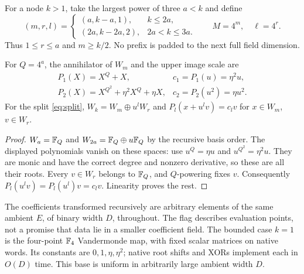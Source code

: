 For a node $k>1$, take the largest power of three $a<k$ and define
\begin{equation}\label{eq:split}
 (m,r,l)=
 \begin{cases}
 (a,k-a,1),& k\leq2a,\\
 (2a,k-2a,2),& 2a<k\leq3a.
 \end{cases}
 \qquad M=4^m,\quad \ell=4^r.
\end{equation}
Thus $1\leq r\leq a$ and $m\geq k/2$. No prefix is padded to the
next full field dimension.

\begin{lemma}\label{lem:annihilator}
For $Q=4^a$, the annihilator of $W_m$ and the upper image scale are
\[
 \begin{array}{ll}
 P_1(X)=X^Q+X,&c_1=P_1(u)=\eta^2u,\\[2pt]
 P_2(X)=X^{Q^2}+\eta^2X^Q+\eta X,
       &c_2=P_2(u^2)=\eta u^2.
 \end{array}
\]
For the split \eqref{eq:split},
$W_k=W_m\oplus u^lW_r$ and $P_l(x+u^lv)=c_lv$ for
$x\in W_m$, $v\in W_r$.
\end{lemma}
\begin{proof}
$W_a=\mathbb F_Q$ and $W_{2a}=\mathbb F_Q\oplus u\mathbb F_Q$ by the recursive
basis order. The displayed polynomials vanish on these spaces: use
$u^Q=\eta u$ and $u^{Q^2}=\eta^2u$. They are monic and have the
correct degree and nonzero derivative, so these are all their roots.
Every $v\in W_r$ belongs to $\mathbb F_Q$, and $Q$-powering fixes $v$.
Consequently $P_l(u^lv)=P_l(u^l)v=c_lv$. Linearity proves the rest.
\end{proof}

The coefficients transformed recursively are arbitrary elements of
the same ambient $E$, of binary width $D$, throughout. The flag
describes evaluation points, not a promise that data lie in a smaller
coefficient field. The bounded case $k=1$ is the four-point
$\mathbb F_4$ Vandermonde map, with fixed scalar matrices on native words.
Its constants are $0,1,\eta,\eta^2$; native root shifts and XORs
implement each in $O(D)$ time. This base is uniform in arbitrarily
large ambient width $D$.

